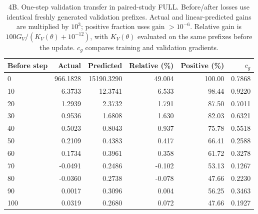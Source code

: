 \begin{table}[!htbp]
\centering
\caption{4B. One-step validation transfer in paired-study FULL. Before/after losses use identical freshly generated validation prefixes. Actual and linear-predicted gains are multiplied by $10^3$; positive fraction uses gain $>10^{-6}$. Relative gain is $100G_V/(K_V(\theta)+10^{-12})$, with $K_V(\theta)$ evaluated on the same prefixes before the update. $c_g$ compares training and validation gradients.}
\label{tab:paired4b_transfer}
\small
\setlength{\tabcolsep}{3pt}
\begin{tabular}{lrrrrr}
\toprule
Before step  &  Actual  &  Predicted  &  Relative (\%)  &  Positive (\%)  &  $c_g$  \\
\midrule
0  &  966.1828  &  15190.3290  &  49.004  &  100.00  &  0.7868  \\
10  &  6.3733  &  12.3741  &  6.533  &  98.44  &  0.9220  \\
20  &  1.2939  &  2.3732  &  1.791  &  87.50  &  0.7011  \\
30  &  0.9536  &  1.6808  &  1.630  &  82.03  &  0.6321  \\
40  &  0.5023  &  0.8043  &  0.937  &  75.78  &  0.5518  \\
50  &  0.2109  &  0.4383  &  0.417  &  66.41  &  0.2588  \\
60  &  0.1734  &  0.3961  &  0.358  &  61.72  &  0.3278  \\
70  &  -0.0491  &  0.2486  &  -0.102  &  53.13  &  0.1267  \\
80  &  -0.0360  &  0.2738  &  -0.078  &  47.66  &  0.2230  \\
90  &  0.0017  &  0.3096  &  0.004  &  56.25  &  0.3463  \\
100  &  0.0319  &  0.2680  &  0.072  &  47.66  &  0.1927  \\
\bottomrule
\end{tabular}
\end{table}
